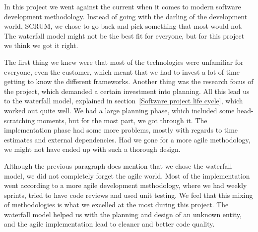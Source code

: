 In this project we went against the current when it comes to modern software development methodology. Instead of going with the darling of the development world, SCRUM, we chose to go back and pick something that most would not. The waterfall model might not be the best fit for everyone, but for this project we think we got it right.

The first thing we knew were that most of the technologies were unfamiliar for everyone, even the customer, which meant that we had to invest a lot of time getting to know the different frameworks. Another thing was the research focus of the project, which demanded a certain investment into planning. All this lead us to the waterfall model, explained in section~\ref{Software project life cycle}, which worked out quite well. We had a large planning phase, which included some head-scratching moments, but for the most part, we got through it. The implementation phase had some more problems, mostly with regards to time estimates and external dependencies. Had we gone for a more agile methodology, we might not have ended up with such a thorough design.

Although the previous paragraph does mention that we chose the waterfall model, we did not completely forget the agile world. Most of the implementation went according to a more agile development methodology, where we had weekly sprints, tried to have code reviews and used unit testing. We feel that this mixing of methodologies is what we excelled at the most during this project. The waterfall model helped us with the planning and design of an unknown entity, and the agile implementation lead to cleaner and better code quality.
